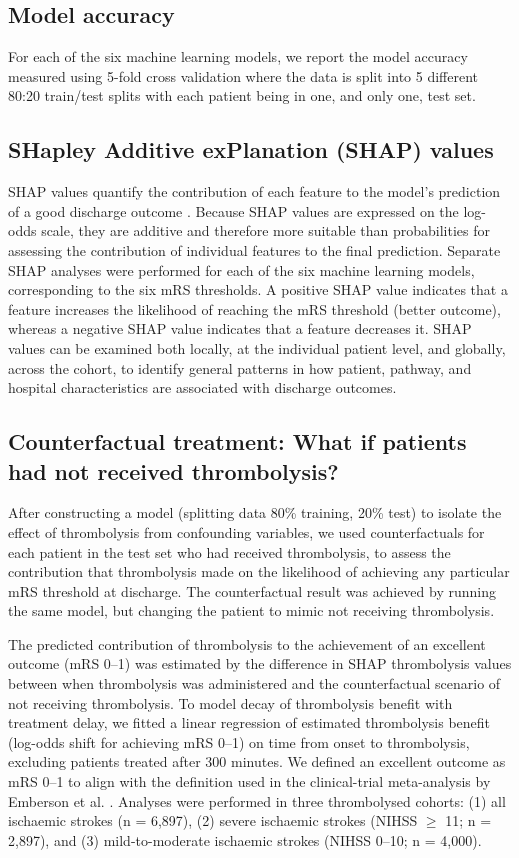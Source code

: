 \subsection{Model accuracy}

For each of the six machine learning models, we report the model accuracy measured using 5-fold cross validation where the data is split into 5 different 80:20 train/test splits with each patient being in one, and only one, test set.

\subsection{SHapley Additive exPlanation (SHAP) values}

SHAP values quantify the contribution of each feature to the model’s prediction of a good discharge outcome \cite{lundberg_unified_2017}. Because SHAP values are expressed on the log-odds scale, they are additive and therefore more suitable than probabilities for assessing the contribution of individual features to the final prediction. Separate SHAP analyses were performed for each of the six machine learning models, corresponding to the six mRS thresholds. A positive SHAP value indicates that a feature increases the likelihood of reaching the mRS threshold (better outcome), whereas a negative SHAP value indicates that a feature decreases it. SHAP values can be examined both locally, at the individual patient level, and globally, across the cohort, to identify general patterns in how patient, pathway, and hospital characteristics are associated with discharge outcomes.

\subsection{Counterfactual treatment:  What if patients had not received thrombolysis?}

After constructing a model (splitting data 80\% training, 20\% test) to isolate the effect of thrombolysis from confounding variables, we used counterfactuals for each patient in the test set who had received thrombolysis, to assess the contribution that thrombolysis made on the likelihood of achieving any particular mRS threshold at discharge. The counterfactual result was achieved by running the same model, but changing the patient to mimic not receiving thrombolysis.

The predicted contribution of thrombolysis to the achievement of an excellent outcome (mRS 0–1) was estimated by the difference in SHAP thrombolysis values between when thrombolysis was administered and the counterfactual scenario of not receiving thrombolysis. To model decay of thrombolysis benefit with treatment delay, we fitted a linear regression of estimated thrombolysis benefit (log-odds shift for achieving mRS 0–1) on time from onset to thrombolysis, excluding patients treated after 300 minutes. We defined an excellent outcome as mRS 0–1 to align with the definition used in the clinical-trial meta-analysis by Emberson et al. \cite{emberson_effect_2014}. Analyses were performed in three thrombolysed cohorts: (1) all ischaemic strokes (n = 6,897), (2) severe ischaemic strokes (NIHSS $\geq$ 11; n = 2,897), and (3) mild-to-moderate ischaemic strokes (NIHSS 0–10; n = 4,000).
